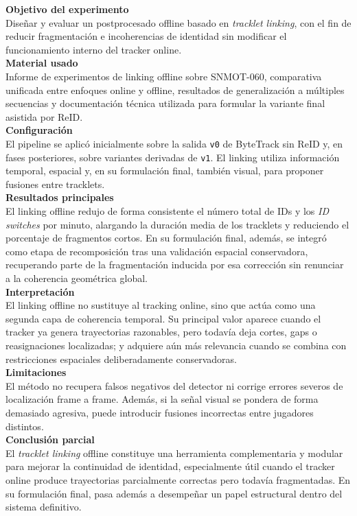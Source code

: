 \documentclass[../MAIN.tex]{subfiles}
\begin{document}
	\begin{chaptertemplatebox}
		\textbf{Objetivo del experimento}\\
		Diseñar y evaluar un postprocesado offline basado en \textit{tracklet linking}, con el fin de reducir fragmentación e incoherencias de identidad sin modificar el funcionamiento interno del tracker online.\\[0.5em]
		
		\textbf{Material usado}\\
		Informe de experimentos de linking offline sobre SNMOT-060, comparativa unificada entre enfoques online y offline, resultados de generalización a múltiples secuencias y documentación técnica utilizada para formular la variante final asistida por ReID.\\[0.5em]
		
		\textbf{Configuración}\\
		El pipeline se aplicó inicialmente sobre la salida \texttt{v0} de ByteTrack sin ReID y, en fases posteriores, sobre variantes derivadas de \texttt{v1}. El linking utiliza información temporal, espacial y, en su formulación final, también visual, para proponer fusiones entre tracklets.\\[0.5em]
		
		\textbf{Resultados principales}\\
		El linking offline redujo de forma consistente el número total de IDs y los \textit{ID switches} por minuto, alargando la duración media de los tracklets y reduciendo el porcentaje de fragmentos cortos. En su formulación final, además, se integró como etapa de recomposición tras una validación espacial conservadora, recuperando parte de la fragmentación inducida por esa corrección sin renunciar a la coherencia geométrica global.\\[0.5em]
		
		\textbf{Interpretación}\\
		El linking offline no sustituye al tracking online, sino que actúa como una segunda capa de coherencia temporal. Su principal valor aparece cuando el tracker ya genera trayectorias razonables, pero todavía deja cortes, gaps o reasignaciones localizadas; y adquiere aún más relevancia cuando se combina con restricciones espaciales deliberadamente conservadoras.\\[0.5em]
		
		\textbf{Limitaciones}\\
		El método no recupera falsos negativos del detector ni corrige errores severos de localización frame a frame. Además, si la señal visual se pondera de forma demasiado agresiva, puede introducir fusiones incorrectas entre jugadores distintos.\\[0.5em]
		
		\textbf{Conclusión parcial}\\
		El \textit{tracklet linking} offline constituye una herramienta complementaria y modular para mejorar la continuidad de identidad, especialmente útil cuando el tracker online produce trayectorias parcialmente correctas pero todavía fragmentadas. En su formulación final, pasa además a desempeñar un papel estructural dentro del sistema definitivo.
	\end{chaptertemplatebox}
	
\end{document}
